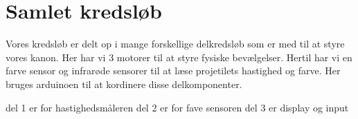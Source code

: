 \section{Samlet kredsløb}
Vores kredsløb er delt op i mange forskellige delkredsløb som er med til at styre vores kanon. Her har vi 3 motorer til at styre fysiske bevælgelser. Hertil har vi en farve sensor og infrarøde sensorer til at læse projetilets hastighed og farve. Her bruges arduinoen til at kordinere disse delkomponenter.

del 1 er for hastighedsmåleren
del 2 er for fave sensoren
del 3 er display og input
